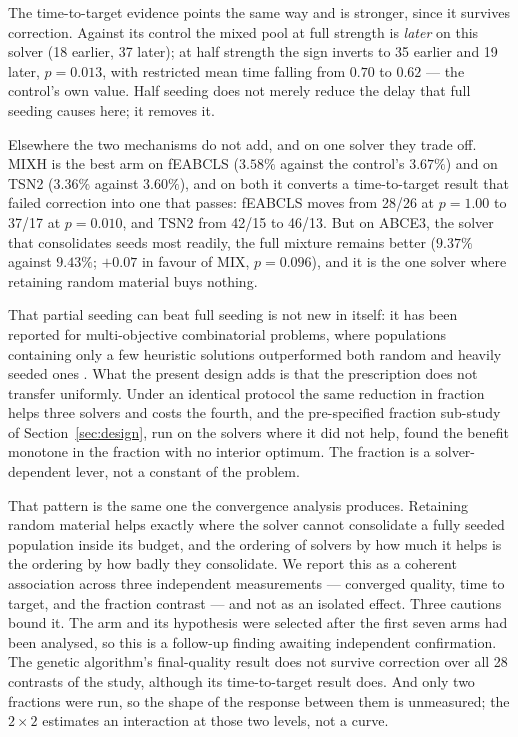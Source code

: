\documentclass[review]{elsarticle}
\begin{document}
The time-to-target evidence points the same way and is stronger, since it
survives correction. Against its control the mixed pool at full strength is
\emph{later} on this solver (18 earlier, 37 later); at half strength the
sign inverts to 35 earlier and 19 later, $p=0.013$, with restricted mean
time falling from $0.70$ to $0.62$ --- the control's own value. Half
seeding does not merely reduce the delay that full seeding causes here; it
removes it.

Elsewhere the two mechanisms do not add, and on one solver they trade off.
MIXH is the best arm on fEABCLS ($3.58\%$ against the control's $3.67\%$)
and on TSN2 ($3.36\%$ against $3.60\%$), and on both it converts a
time-to-target result that failed correction into one that passes: fEABCLS
moves from 28/26 at $p=1.00$ to 37/17 at $p=0.010$, and TSN2 from 42/15 to
46/13. But on ABCE3, the solver that consolidates seeds most readily, the
full mixture remains better ($9.37\%$ against $9.43\%$; $+0.07$ in favour of
MIX, $p=0.096$), and it is the one solver where retaining random material
buys nothing.

That partial seeding can beat full seeding is not new in itself: it has
been reported for multi-objective combinatorial problems, where populations
containing only a few heuristic solutions outperformed both random and
heavily seeded ones \cite{Gong2023few}. What the present design adds is
that the prescription does not transfer uniformly. Under an identical
protocol the same reduction in fraction helps three solvers and costs the
fourth, and the pre-specified fraction sub-study of
Section~\ref{sec:design}, run on the solvers where it did not help, found
the benefit monotone in the fraction with no interior optimum. The
fraction is a solver-dependent lever, not a constant of the problem.

That pattern is the same one the convergence analysis produces. Retaining
random material helps exactly where the solver cannot consolidate a fully
seeded population inside its budget, and the ordering of solvers by how
much it helps is the ordering by how badly they consolidate. We report this
as a coherent association across three independent measurements ---
converged quality, time to target, and the fraction contrast --- and not as
an isolated effect. Three cautions bound it. The arm and its hypothesis were
selected after the first seven arms had been analysed, so this is a
follow-up finding awaiting independent confirmation. The genetic algorithm's
final-quality result does not survive correction over all 28 contrasts of
the study, although its time-to-target result does. And only two fractions
were run, so the shape of the response between them is unmeasured; the
$2\times2$ estimates an interaction at those two levels, not a curve.
\end{document}
